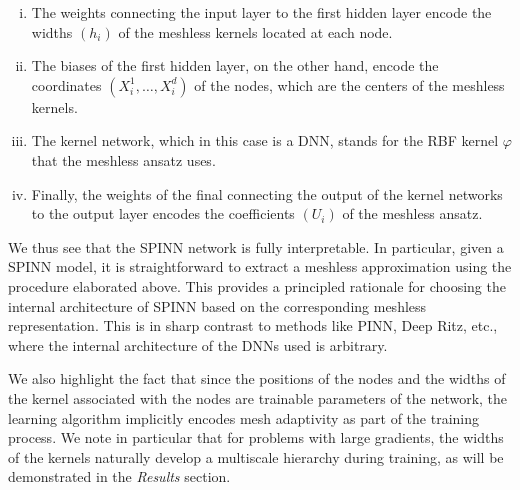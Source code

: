 \documentclass[12pt]{article}
\begin{document}
\begin{enumerate}[(i)]
\item The weights connecting the input layer to the first hidden layer encode the widths $(h_i)$ of the meshless kernels located at each node.
\item The biases of the first hidden layer, on the other hand, encode the coordinates $(X_i^1, \ldots, X_i^d)$ of the nodes, which are the centers of the meshless kernels.
\item The kernel network, which in this case is a DNN, stands for the RBF kernel $\varphi$ that the meshless ansatz uses.
\item Finally, the weights of the final connecting the output of the kernel networks to the output layer encodes the coefficients $(U_i)$ of the meshless ansatz.
\end{enumerate}

We thus see that the SPINN network is fully interpretable. In particular, given a SPINN model, it is straightforward to extract a meshless approximation using the procedure elaborated above. This provides a principled rationale for choosing the internal architecture of SPINN based on the corresponding meshless representation. This is in sharp contrast to methods like PINN, Deep Ritz, etc., where the internal architecture of the DNNs used is arbitrary.

We also highlight the fact that since the positions of the nodes and the widths of the kernel associated with the nodes are trainable parameters of the network, the learning algorithm implicitly encodes mesh adaptivity as part of the training process. We note in particular that for problems with large gradients, the widths of the kernels naturally develop a multiscale hierarchy during training, as will be demonstrated in the \emph{Results} section.
\end{document}
